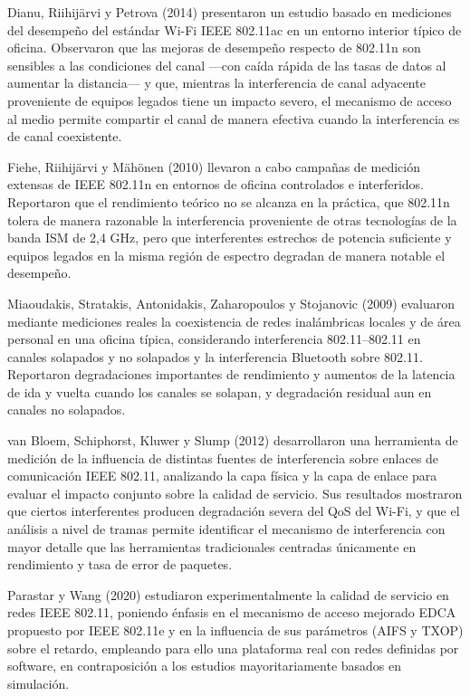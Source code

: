 \documentclass[
  12pt,
]{article}
\begin{document}
Dianu, Riihijärvi y Petrova (2014) presentaron un estudio basado en
mediciones del desempeño del estándar Wi-Fi IEEE 802.11ac en un entorno
interior típico de oficina. Observaron que las mejoras de desempeño
respecto de 802.11n son sensibles a las condiciones del canal —con caída
rápida de las tasas de datos al aumentar la distancia— y que, mientras
la interferencia de canal adyacente proveniente de equipos legados tiene
un impacto severo, el mecanismo de acceso al medio permite compartir el
canal de manera efectiva cuando la interferencia es de canal
coexistente.

Fiehe, Riihijärvi y Mähönen (2010) llevaron a cabo campañas de medición
extensas de IEEE 802.11n en entornos de oficina controlados e
interferidos. Reportaron que el rendimiento teórico no se alcanza en la
práctica, que 802.11n tolera de manera razonable la interferencia
proveniente de otras tecnologías de la banda ISM de 2,4 GHz, pero que
interferentes estrechos de potencia suficiente y equipos legados en la
misma región de espectro degradan de manera notable el desempeño.

Miaoudakis, Stratakis, Antonidakis, Zaharopoulos y Stojanovic (2009)
evaluaron mediante mediciones reales la coexistencia de redes
inalámbricas locales y de área personal en una oficina típica,
considerando interferencia 802.11–802.11 en canales solapados y no
solapados y la interferencia Bluetooth sobre 802.11. Reportaron
degradaciones importantes de rendimiento y aumentos de la latencia de
ida y vuelta cuando los canales se solapan, y degradación residual aun
en canales no solapados.

van Bloem, Schiphorst, Kluwer y Slump (2012) desarrollaron una
herramienta de medición de la influencia de distintas fuentes de
interferencia sobre enlaces de comunicación IEEE 802.11, analizando la
capa física y la capa de enlace para evaluar el impacto conjunto sobre
la calidad de servicio. Sus resultados mostraron que ciertos
interferentes producen degradación severa del QoS del Wi-Fi, y que el
análisis a nivel de tramas permite identificar el mecanismo de
interferencia con mayor detalle que las herramientas tradicionales
centradas únicamente en rendimiento y tasa de error de paquetes.

Parastar y Wang (2020) estudiaron experimentalmente la calidad de
servicio en redes IEEE 802.11, poniendo énfasis en el mecanismo de
acceso mejorado EDCA propuesto por IEEE 802.11e y en la influencia de
sus parámetros (AIFS y TXOP) sobre el retardo, empleando para ello una
plataforma real con redes definidas por software, en contraposición a
los estudios mayoritariamente basados en simulación.
\end{document}
